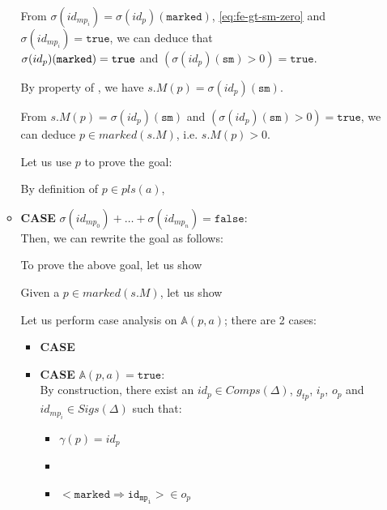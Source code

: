 \documentclass[dvipsnames,12pt]{article}
\begin{document}
\begin{niproof}
\begin{itemize}
\begin{itemize}
      \noindent{}From $\sigma(id_{mp_i})=\sigma(id_{p})(\texttt{marked})$,
      \eqref{eq:fe-gt-sm-zero} and $\sigma(id_{mp_i})=\mathtt{true}$,
      we can deduce that\\ $\sigma(id_{p})(\texttt{mar\-ked})=\mathtt{true}$
      and $(\sigma(id_{p})(\texttt{sm})>0)=\mathtt{true}$.
      
      \noindent{}By property of \upSim, we have
      $s.M(p)=\sigma(id_{p})(\texttt{sm})$.
      
      \noindent{}From $s.M(p)=\sigma(id_{p})(\texttt{sm})$ and
      $(\sigma(id_{p})(\texttt{sm})>0)=\mathtt{true}$, we can deduce
      $p\in{}marked(s.M)$, i.e. $s.M(p)>0$.

      Let us use $p$ to prove the goal:

      By definition of $p\in{}pls(a)$,

    \item \textbf{CASE} $\sigma(id_{mp_0})+\dots+\sigma(id_{mp_n})=\mathtt{false}$:\\
      
      Then, we can rewrite the goal as follows:

      \noindent{}To prove the above goal, let us show

      \noindent{}Given a $p\in{}marked(s.M)$, let us show

      \noindent{}Let us perform case analysis on $\mathbb{A}(p,a)$;
      there are 2 cases:

      \begin{itemize}
      \item \textbf{CASE} 
      \item \textbf{CASE} $\mathbb{A}(p,a)=\mathtt{true}$:\\
        By construction, there exist an $id_{p}\in{}Comps(\Delta)$,
        $g_{tp}$, $i_{p}$, $o_{p}$ and
        $id_{mp_i}\in{}Sigs(\Delta)$ such that:
        \begin{itemize}
        \item $\gamma(p)=id_{p}$
        \item \InCsCompP
        \item ${<}\mathtt{marked\Rightarrow{}id_{mp_i}}{>}\in{}o_{p}$
        \end{itemize}


\end{itemize}
\end{itemize}
\end{itemize}
\end{niproof}
\end{document}
